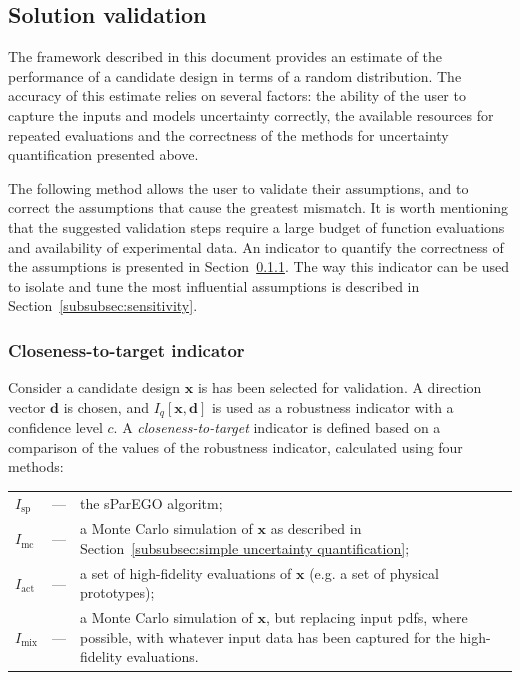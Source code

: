 \documentclass[a4paper]{article}
\newcommand{\Iq}[1]{\ensuremath{I_q\!\left[{#1}\right]}} %
\newcommand{\vx}{\ensuremath{\mathbf{x}}} %
\newcommand{\vd}{\ensuremath{\mathbf{d}}} %
\begin{document}
\subsection{Solution validation}
\label{subsec:validation}
The framework described in this document provides an estimate of the performance of a candidate design in terms of a random distribution. The accuracy of this estimate relies on several factors: the ability of the user to capture the inputs and models uncertainty correctly, the available resources for repeated evaluations and the correctness of the methods for uncertainty quantification presented above.

The following method allows the user to validate their assumptions, and to correct the assumptions that cause the greatest mismatch. It is worth mentioning that the suggested validation steps require a large budget of function evaluations and availability of experimental data.
An indicator to quantify the correctness of the assumptions is presented in Section~\ref{subsubsec:closeness-to-target}. The way this indicator can be used to isolate and tune the most influential assumptions is described in Section~\ref{subsubsec:sensitivity}.

\subsubsection{Closeness-to-target indicator}
\label{subsubsec:closeness-to-target}
Consider a candidate design $\vx$ is has been selected for validation. A direction vector $\vd$ is chosen, and $\Iq{\vx,\vd}$ is used as a robustness indicator with a confidence level $c$. A \textit{closeness-to-target} indicator is defined based on a comparison of the values of the robustness indicator, calculated using four methods:

\medskip\noindent
\begin{tabularx}{\textwidth}{lcX}
$I_\text{sp}$	& --- & the sParEGO algoritm;\\
$I_\text{mc}$	& --- & a Monte Carlo simulation of $\vx$ as described in Section~\ref{subsubsec:simple uncertainty quantification};\\
$I_\text{act}$	& --- & a set of high-fidelity evaluations of $\vx$ (e.g. a set of physical prototypes);\\
$I_\text{mix}$	& --- & a Monte Carlo simulation of $\vx$, but replacing input pdfs, where possible, with whatever input data has been captured for the high-fidelity evaluations.
\end{tabularx}
\end{document}
